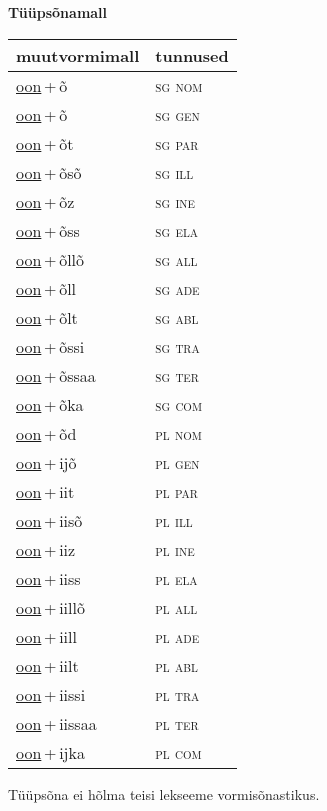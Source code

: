 
\vspace{1.8em}
\begin{minipage}{\textwidth}
\textbf{Tüüpsõnamall \,}\\

\begin{sideways}
\begin{tabular}{l l}
muutvormimall & tunnused \\
\hline
\underline{oon}\,+\,õ & \textsc{ sg nom } \\
\underline{oon}\,+\,õ & \textsc{ sg gen } \\
\underline{oon}\,+\,õt & \textsc{ sg par } \\
\underline{oon}\,+\,õsõ & \textsc{ sg ill } \\
\underline{oon}\,+\,õz & \textsc{ sg ine } \\
\underline{oon}\,+\,õss & \textsc{ sg ela } \\
\underline{oon}\,+\,õllõ & \textsc{ sg all } \\
\underline{oon}\,+\,õll & \textsc{ sg ade } \\
\underline{oon}\,+\,õlt & \textsc{ sg abl } \\
\underline{oon}\,+\,õssi & \textsc{ sg tra } \\
\underline{oon}\,+\,õssaa & \textsc{ sg ter } \\
\underline{oon}\,+\,õka & \textsc{ sg com } \\
\underline{oon}\,+\,õd & \textsc{ pl nom } \\
\underline{oon}\,+\,ijõ & \textsc{ pl gen } \\
\underline{oon}\,+\,iit & \textsc{ pl par } \\
\underline{oon}\,+\,iisõ & \textsc{ pl ill } \\
\underline{oon}\,+\,iiz & \textsc{ pl ine } \\
\underline{oon}\,+\,iiss & \textsc{ pl ela } \\
\underline{oon}\,+\,iillõ & \textsc{ pl all } \\
\underline{oon}\,+\,iill & \textsc{ pl ade } \\
\underline{oon}\,+\,iilt & \textsc{ pl abl } \\
\underline{oon}\,+\,iissi & \textsc{ pl tra } \\
\underline{oon}\,+\,iissaa & \textsc{ pl ter } \\
\underline{oon}\,+\,ijka & \textsc{ pl com } \\
\end{tabular}
\end{sideways}
\label{tab:tüüpsõnamall-oonõ}

\end{minipage}

 
\vspace{1em}
\noindent Tüüpsõna ei hõlma teisi lekseeme vormi\-sõnastikus.

